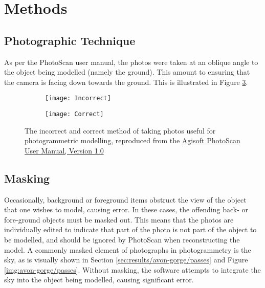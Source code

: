 \section{Methods}

\subsection{Photographic Technique}
\label{sec:methods/photographic-technique}

As per the PhotoScan user
manual, the
photos were taken at an oblique angle to the object being modelled (namely the
ground). This amount to ensuring that the camera is facing down towards the
ground. This is illustrated in Figure \ref{img:photographic-method}.

\begin{figure}[H]
    \centering
    \begin{subfigure}[b]{0.49\textwidth}
        \texttt{[image: Incorrect]}
        \label{img:incorrect}
    \end{subfigure}
    \begin{subfigure}[b]{0.49\textwidth}
        \texttt{[image: Correct]}
        \label{img:correct}
    \end{subfigure}
    \caption{The incorrect and correct method of taking photos useful for
        photogrammetric modelling, reproduced from the
        \href{http://downloads.agisoft.ru/pdf/photoscan-pro\_1\_0\_0\_en.pdf}{Agisoft
        PhotoScan User Manual, Version 1.0}}
    \label{img:photographic-method}
\end{figure}

\subsection{Masking}
\label{sec:methods/masking}

Occasionally, background or foreground items obstruct the view of the object
that one wishes to model, causing error. In these cases, the offending back- or
fore-ground objects must be masked out. This means that the photos are
individually edited to indicate that part of the photo is not part of the object
to be modelled, and should be ignored by PhotoScan when reconstructing the
model. A commonly masked element of photographs in photogrammetry is the sky, as
is visually shown in Section \ref{sec:results/avon-gorge/passes} and Figure
\ref{img:avon-gorge/passes}. Without masking, the software attempts to integrate
the sky into the object being modelled, causing significant error.

